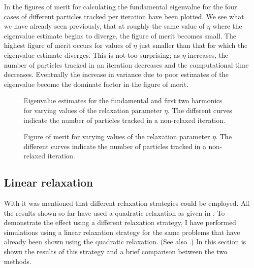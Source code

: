 In  the figures of merit for calculating the fundamental eigenvalue for the four cases of different particles tracked per iteration have been plotted.  We see what we have already seen previously, that at roughly the same value of $\eta$ where the eigenvalue estimate begins to diverge, the figure of merit becomes small.  The highest figure of merit occurs for values of $\eta$ just smaller than that for which the eigenvalue estimate diverges.  This is not too surprising; as $\eta$ increases, the number of particles tracked in an iteration decreases and the computational time decreases.  Eventually the increase in variance due to poor estimates of the eigenvalue become the dominate factor in the figure of merit.  

\begin{sidewaysfigure}\centering
    
    \caption{Eigenvalue estimates for the fundamental and first two harmonics for varying values of the relaxation parameter $\eta$.  The different curves indicate the number of particles tracked in a non-relaxed iteration.}
    \label{fig:RelaxedArnoldiComboValues}
\end{sidewaysfigure}

\begin{sidewaysfigure}\centering
    
    \caption{Figure of merit for varying values of the relaxation parameter $\eta$.  The different curves indicate the number of particles tracked in a non-relaxed iteration.}
    \label{fig:RelaxedArnoldiComboFOM}
\end{sidewaysfigure}

\clearpage
\subsection{Linear relaxation \label{sec:LinearRelaxation} }
With  it was mentioned that different relaxation strategies could be employed.  All the results shown so far have used a quadratic relaxation as given in .  To demonstrate the effect using a different relaxation strategy, I have performed simulations using a linear relaxation strategy for the same problems that have already been shown using the quadratic relaxation.  (See also \citet{Conlin:2009Relax-0}.)  In this section is shown the results of this strategy and a brief comparison between the two methods.  

